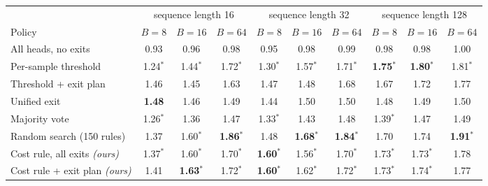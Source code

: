 \begin{tabular}{@{}lccccccccc@{}}
\toprule
 & \multicolumn{3}{c}{sequence length 16} & \multicolumn{3}{c}{sequence length 32} & \multicolumn{3}{c}{sequence length 128} \\
\cmidrule(lr){2-4}\cmidrule(lr){5-7}\cmidrule(lr){8-10}
Policy & $B=8$ & $B=16$ & $B=64$ & $B=8$ & $B=16$ & $B=64$ & $B=8$ & $B=16$ & $B=64$ \\
\midrule
All heads, no exits & 0.93 & 0.96 & 0.98 & 0.95 & 0.98 & 0.99 & 0.98 & 0.98 & 1.00 \\
\midrule
Per-sample threshold & 1.24$^{*}$ & 1.44$^{*}$ & 1.72$^{*}$ & 1.30$^{*}$ & 1.57$^{*}$ & 1.71$^{*}$ & \textbf{1.75}$^{*}$ & \textbf{1.80}$^{*}$ & 1.81$^{*}$ \\
Threshold + exit plan & 1.46 & 1.45 & 1.63 & 1.47 & 1.48 & 1.68 & 1.67 & 1.72 & 1.77 \\
Unified exit & \textbf{1.48} & 1.46 & 1.49 & 1.44 & 1.50 & 1.50 & 1.48 & 1.49 & 1.50 \\
Majority vote & 1.26$^{*}$ & 1.36 & 1.47 & 1.33$^{*}$ & 1.43 & 1.48 & 1.39$^{*}$ & 1.47 & 1.49 \\
Random search (150 rules) & 1.37 & 1.60$^{*}$ & \textbf{1.86}$^{*}$ & 1.48 & \textbf{1.68}$^{*}$ & \textbf{1.84}$^{*}$ & 1.70 & 1.74 & \textbf{1.91}$^{*}$ \\
\midrule
Cost rule, all exits \textit{(ours)} & 1.37$^{*}$ & 1.60$^{*}$ & 1.70$^{*}$ & \textbf{1.60}$^{*}$ & 1.56$^{*}$ & 1.70$^{*}$ & 1.73$^{*}$ & 1.73$^{*}$ & 1.78 \\
Cost rule + exit plan \textit{(ours)} & 1.41 & \textbf{1.63}$^{*}$ & 1.72$^{*}$ & \textbf{1.60}$^{*}$ & 1.62$^{*}$ & 1.72$^{*}$ & 1.73$^{*}$ & 1.74$^{*}$ & 1.77 \\
\bottomrule
\end{tabular}
